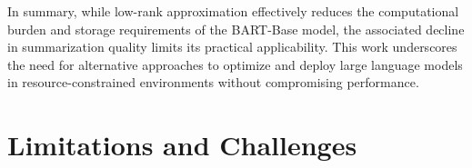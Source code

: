         In summary, while low-rank approximation effectively reduces the computational burden and storage requirements of the BART-Base model, the associated decline in summarization quality limits its practical applicability. This work underscores the need for alternative approaches to optimize and deploy large language models in resource-constrained environments without compromising performance.

\section{Limitations and Challenges}